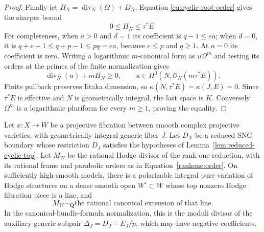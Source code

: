 \begin{proof}
Finally let $H_N=\operatorname{div}_N(\Omega)+D_N$. Equation
\eqref{eq:cyclic-root-order} gives the sharper bound
\[
             0\le H_N\le\tau^*E.
\]
For completeness, when $a>0$ and $d=1$ its coefficient is
$q-1\le ea$; when $d=0$, it is
$q+e-1\le q+p-1\le pq=ea$, because $e\le p$ and $q\ge1$.
At $a=0$ its coefficient is zero.
Writing a logarithmic $m$-canonical form as $u\Omega^m$ and
testing its orders at the primes of the finite normalization gives
\[
 \operatorname{div}_N(u)+mH_N\ge0,
 \qquad
 u\in H^0(N,\mathcal O_N(m\tau^*E)).
\]
Finite pullback preserves Iitaka dimension, so
$\kappa(N,\tau^*E)=\kappa(J,E)=0$. Since $\tau^*E$ is
effective and $N$ is geometrically integral, the last space is
$K$. Conversely $\Omega^m$ is a logarithmic pluriform for every
$m\ge1$, proving the equality.
\end{proof}

\begin{corollary}
\label{cor:reduced-integral-moduli}
Let $x:X\to W$ be a projective fibration between smooth complex
projective varieties, with geometrically integral generic fiber
$J$. Let $D_X$ be a reduced SNC boundary whose restriction $D_J$
satisfies the hypotheses of Lemma~\ref{lem:reduced-cyclic-top}.
Let $M_W$ be the rational Hodge divisor of the rank-one reduction,
with its rational frame and parabolic orders as in
Equation~\eqref{rankone:order}. On sufficiently high smooth models,
there is a polarizable integral pure variation
of Hodge structures on a dense smooth open $W^\circ\subset W$
whose top nonzero Hodge filtration piece is a line, and
\[
 M_W\sim_{\mathbf Q}
 \text{the rational canonical extension of that line}.
\]
In the canonical-bundle-formula normalization, this is the moduli
divisor of the auxiliary generic subpair
$\Delta_J=D_J-E_J/p$, which may have negative coefficients.
\end{corollary}

